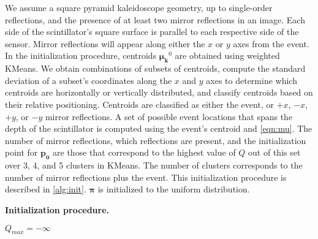 We assume a square pyramid kaleidoscope geometry, up to single-order reflections, 
and the presence of at least two mirror reflections in an image.
Each side of the scintillator's square surface is parallel to each respective side 
of the sensor.
Mirror reflections will appear along either the $x$ or $y$ axes from the event.
In the initialization procedure, centroids $\bm{\mu_k}^0$ are obtained using 
weighted KMeans.
We obtain combinations of subsets of centroids, compute the standard deviation of 
a subset's coordinates along the $x$ and $y$ axes to determine which centroids are 
horizontally or vertically distributed, and classify centroids based on their 
relative positioning. 
Centroids are classified as either the event, or $+x$, $-x$, $+y$, or $-y$ mirror reflections. 
A set of possible event locations that spans the depth of the scintillator is 
computed using the event's centroid and \cref{eqn:mu}.
The number of mirror reflections, which reflections are present, and the 
initialization point for $\bm{p_0}$ are those that correspond to the 
highest value of $Q$ out of this set over 3, 4, and 5 clusters in KMeans.
The number of clusters corresponds to the number of mirror reflections plus the event.
This initialization procedure is described in \cref{alg:init}.
$\bm{\pi}$ is initialized to the uniform distribution.


\begin{algorithm}
\caption{\textbf{Initialization procedure.}} \label{alg:init}
\DontPrintSemicolon
{}
$Q_{max} = -\infty$\;
\end{algorithm}

